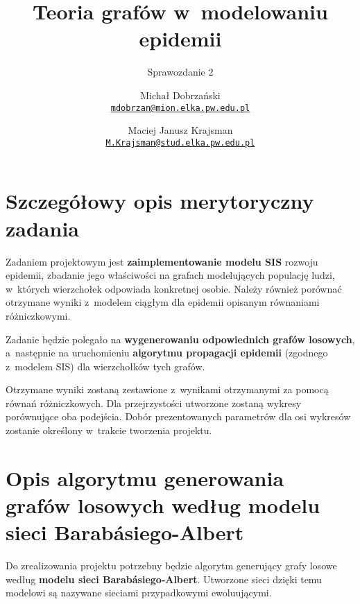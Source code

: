 

\title{Teoria grafów w~modelowaniu epidemii}
\subtitle{Sprawozdanie 2}
\author{%
	Michał Dobrzański\\
	\texttt{\href{mailto:mdobrzan@mion.elka.pw.edu.pl}%
		{\nolinkurl{mdobrzan@mion.elka.pw.edu.pl}}}
	\and
	Maciej Janusz Krajsman\\
	\texttt{\href{mailto:M.Krajsman@stud.elka.pw.edu.pl}%
		{\nolinkurl{M.Krajsman@stud.elka.pw.edu.pl}}}
}



\maketitle
\tableofcontents
\clearpage

\section{Szczegółowy opis merytoryczny zadania}
\label{sec:szczegolowy_opis_merytoryczny_zadania}

Zadaniem projektowym jest \textbf{zaimplementowanie modelu SIS} rozwoju epidemii, zbadanie jego właściwości na grafach modelujących populację ludzi, w~których wierzchołek odpowiada konkretnej osobie. Należy również porównać otrzymane wyniki z~modelem ciągłym dla epidemii opisanym równaniami różniczkowymi.  

Zadanie będzie polegało na \textbf{wygenerowaniu odpowiednich grafów losowych}, a~następnie na uruchomieniu \textbf{algorytmu propagacji epidemii} (zgodnego z~modelem SIS) dla wierzchołków tych grafów.

Otrzymane wyniki zostaną zestawione z~wynikami otrzymanymi za pomocą równań różniczkowych. Dla przejrzystości utworzone zostaną wykresy porównujące oba podejścia. Dobór prezentowanych parametrów dla osi wykresów zostanie określony w~trakcie tworzenia projektu.


\section{Opis algorytmu generowania grafów losowych według modelu sieci Barabásiego-Albert}
\label{sec:opis_alg_ba}

Do zrealizowania projektu potrzebny będzie algorytm generujący grafy losowe według \textbf{modelu sieci Barabásiego-Albert}. Utworzone sieci dzięki temu modelowi są nazywane sieciami przypadkowymi ewoluującymi.

